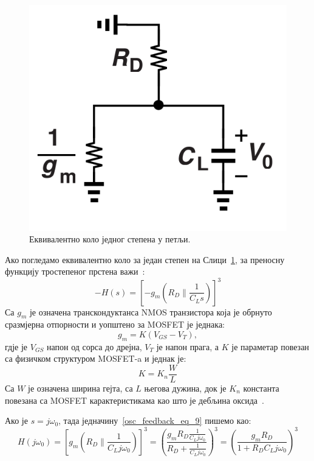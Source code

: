 \documentclass[master]{finthesis}
\begin{document}
\begin{figure}[!ht]
	 \centering
	 \includegraphics[scale=0.2]{slike/ring_osc_3.png}
	 \caption{Еквивалентно коло једног степена у петљи.}
	 \label{ring_osc_3}
\end{figure}
Ако погледамо еквивалентно коло за један степен на Слици~\ref{ring_osc_3}, за преносну функцију тростепеног прстена важи~\cite{Razavi:PLL_CMOS_2020}:
\begin{equation} 
	\label{osc_feedback_eq_9}
	-H(s) = \left[-g_{m}\left(R_{D}\|\frac{1}{C_{L}s}\right)\right]^{3}
\end{equation}
Са $g_{m}$ је означена транскондуктанса NMOS транзистора која је обрнуто сразмјерна отпорности и уопштено за MOSFET је једнака:
\begin{equation} 
	\label{osc_feedback_eq_9_1}
	g_{m} = K(V_{GS} - V_{T}),
\end{equation}
гдје је $V_{GS}$ напон од сорса до дрејна, $V_{T}$ је напон прага, а $K$ је параметар повезан са физичком структуром MOSFET-a и једнак је:
\begin{equation} 
	\label{osc_feedback_eq_9_2}
        K = K_{n} \frac{W}{L}
\end{equation}
Са $W$ је означена ширина гејта, са $L$ његова дужина, док је $K_{n}$ константа повезана са MOSFET карактеристикама као што је дебљина оксида~\cite{AGARWAL:2005foundations}. \par
Ако је $s=j\omega_{0}$, тада једначину~\ref{osc_feedback_eq_9} пишемо као:
\begin{equation} 
	\label{osc_feedback_eq_10}
	\displaystyle
	H(j\omega_{0}) = \left[g_{m}\left(R_{D}\|\frac{1}{C_{L}j\omega_{0}}\right)\right]^{3} = \left(\frac{g_{m}R_{D}\displaystyle\frac{1}{C_{L}j\omega_{0}}}{R_{D}+\displaystyle\frac{1}{C_{L}j\omega_{0}}}\right)^{3} = \left(\frac{g_{m}R_{D}}{1+R_{D}C_{L}j\omega_{0}}\right)^{3}
\end{equation}
\end{document}
